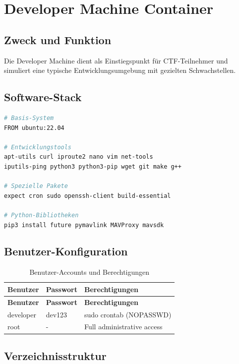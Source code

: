 \documentclass[11pt,a4paper]{article}
\begin{document}
\section{Developer Machine Container}

\subsection{Zweck und Funktion}

Die Developer Machine dient als Einstiegspunkt für CTF-Teilnehmer und simuliert eine typische Entwicklungsumgebung mit gezielten Schwachstellen.

\subsection{Software-Stack}

\begin{lstlisting}[language=bash, caption=Installierte Pakete]
# Basis-System
FROM ubuntu:22.04

# Entwicklungstools
apt-utils curl iproute2 nano vim net-tools
iputils-ping python3 python3-pip wget git make g++

# Spezielle Pakete
expect cron sudo openssh-client build-essential

# Python-Bibliotheken
pip3 install future pymavlink MAVProxy mavsdk
\end{lstlisting}

\subsection{Benutzer-Konfiguration}

\begin{longtable}{|l|l|l|}
\caption{Benutzer-Accounts und Berechtigungen} \\
\hline
\textbf{Benutzer} & \textbf{Passwort} & \textbf{Berechtigungen} \\
\hline
\endfirsthead
\hline
\textbf{Benutzer} & \textbf{Passwort} & \textbf{Berechtigungen} \\
\hline
\endhead
\hline
\endfoot
\hline
\endlastfoot

developer & dev123 & sudo crontab (NOPASSWD) \\
root & - & Full administrative access \\
\end{longtable}

\subsection{Verzeichnisstruktur}
\end{document}

